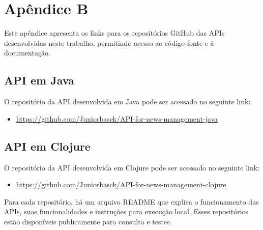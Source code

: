 





\appendix
\chapter{Apêndice B}

Este apêndice apresenta os links para os repositórios GitHub das APIs desenvolvidas neste trabalho, permitindo acesso ao código-fonte e à documentação.

\section*{API em Java}
O repositório da API desenvolvida em Java pode ser acessado no seguinte link:
\begin{itemize}
    \item \url{https://github.com/Juniorbasck/API-for-news-management-java}
\end{itemize}

\section*{API em Clojure}
O repositório da API desenvolvida em Clojure pode ser acessado no seguinte link:
\begin{itemize}
    \item \url{https://github.com/Juniorbasck/API-for-news-management-clojure}
\end{itemize}

Para cada repositório, há um arquivo README que explica o funcionamento das APIs, suas funcionalidades e instruções para execução local. Esses repositórios estão disponíveis publicamente para consulta e testes.
